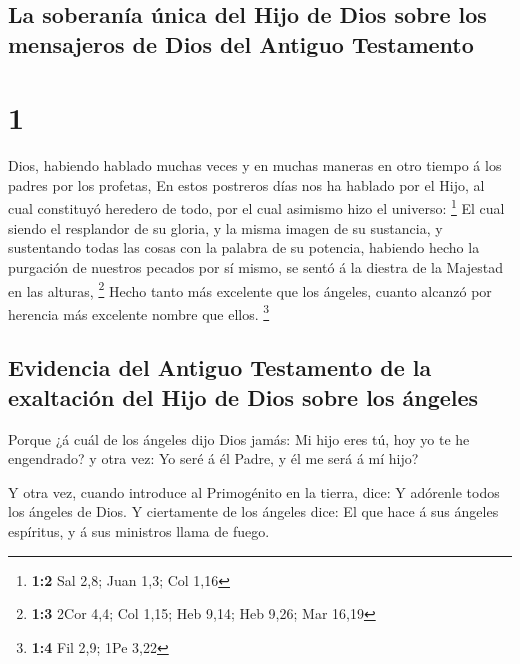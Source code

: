 \hypertarget{la-soberanuxeda-uxfanica-del-hijo-de-dios-sobre-los-mensajeros-de-dios-del-antiguo-testamento}{%
\subsection{La soberanía única del Hijo de Dios sobre los mensajeros de
Dios del Antiguo
Testamento}\label{la-soberanuxeda-uxfanica-del-hijo-de-dios-sobre-los-mensajeros-de-dios-del-antiguo-testamento}}

\hypertarget{section}{%
\section{1}\label{section}}

 Dios, habiendo hablado muchas veces y en muchas maneras
en otro tiempo á los padres por los profetas,  En estos
postreros días nos ha hablado por el Hijo, al cual constituyó heredero
de todo, por el cual asimismo hizo el universo: \footnote{\textbf{1:2}
  Sal 2,8; Juan 1,3; Col 1,16}  El cual siendo el
resplandor de su gloria, y la misma imagen de su sustancia, y
sustentando todas las cosas con la palabra de su potencia, habiendo
hecho la purgación de nuestros pecados por sí mismo, se sentó á la
diestra de la Majestad en las alturas, \footnote{\textbf{1:3} 2Cor 4,4;
  Col 1,15; Heb 9,14; Heb 9,26; Mar 16,19}  Hecho tanto
más excelente que los ángeles, cuanto alcanzó por herencia más excelente
nombre que ellos. \footnote{\textbf{1:4} Fil 2,9; 1Pe 3,22}

\hypertarget{evidencia-del-antiguo-testamento-de-la-exaltaciuxf3n-del-hijo-de-dios-sobre-los-uxe1ngeles}{%
\subsection{Evidencia del Antiguo Testamento de la exaltación del Hijo
de Dios sobre los
ángeles}\label{evidencia-del-antiguo-testamento-de-la-exaltaciuxf3n-del-hijo-de-dios-sobre-los-uxe1ngeles}}

 Porque ¿á cuál de los ángeles dijo Dios jamás: Mi hijo
eres tú, hoy yo te he engendrado? y otra vez: Yo seré á él Padre, y él
me será á mí hijo?

 Y otra vez, cuando introduce al Primogénito en la tierra,
dice: Y adórenle todos los ángeles de Dios.  Y ciertamente
de los ángeles dice: El que hace á sus ángeles espíritus, y á sus
ministros llama de fuego.

